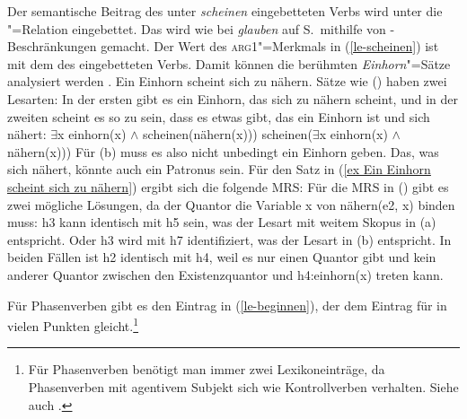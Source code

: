{Der semantische Beitrag des unter \emph{scheinen} eingebetteten Verbs wird unter die "=Relation
eingebettet. Das wird wie bei \emph{glauben} auf S.\,\pageref{le-glauben} mithilfe von
\qeq\hyp Beschränkungen gemacht. Der Wert des \textsc{arg1}"=Merkmals in (\ref{le-scheinen}) ist \qeq mit dem \ltopw des
eingebetteten Verbs. Damit können die berühmten \emph{Einhorn}"=Sätze analysiert werden
\citep*[316--317]{mrs}.
\ea
\label{ex Ein Einhorn scheint sich zu nähern}
Ein Einhorn scheint sich zu nähern.
\z
Sätze wie () haben zwei Lesarten: In der ersten gibt es ein Einhorn, das sich zu nähern
scheint, und in der zweiten scheint es so zu sein, dass es etwas gibt, das ein Einhorn ist und sich
nähert:
\eal
\ex $\exists$x einhorn(x) $\wedge$ scheinen(nähern(x)))
\ex scheinen($\exists$x einhorn(x) $\wedge$ nähern(x)))
\zl
Für (b) muss es also nicht unbedingt ein Einhorn geben. Das, was sich nähert, könnte auch ein
Patronus sein. Für den Satz in (\ref{ex Ein Einhorn scheint sich zu nähern}) ergibt sich die
folgende MRS:
\ea
{}
\z
Für die MRS in () gibt es zwei mögliche Lösungen, da der Quantor die Variable x von
nähern(e2, x) binden muss: h3 kann identisch mit h5 sein, was der
Lesart mit weitem Skopus in (a) entspricht. Oder h3 wird mit h7 identifiziert, was der
Lesart in (b) entspricht. In beiden Fällen ist h2 identisch mit h4, weil es nur einen
Quantor gibt und kein anderer Quantor zwischen den Existenzquantor und h4:einhorn(x) treten kann.

Für Phasenverben gibt es den Eintrag in (\ref{le-beginnen}), der dem Eintrag für 
in vielen Punkten gleicht.\footnote{\label{fn-phase-verbs-control}%
        Für Phasenverben benötigt man immer zwei Lexikoneinträge, da Phasenverben
        mit agentivem Subjekt sich wie Kontrollverben verhalten. Siehe auch .%
}

}
